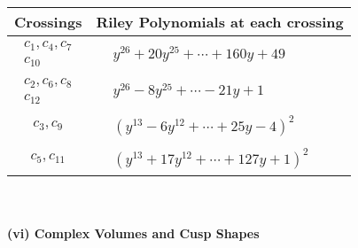 \documentclass[1p]{elsarticle_modified}
\theoremstyle{definition}
\begin{document}
\begin{tabular}{m{50pt}|m{274pt}}
Crossings & \hspace{64pt}Riley Polynomials at each crossing \\
\hline $$\begin{aligned}c_{1},c_{4},c_{7}\\c_{10}\end{aligned}$$&$\begin{aligned}
&y^{26}+20 y^{25}+\cdots+160 y+49
\end{aligned}$\\
\hline $$\begin{aligned}c_{2},c_{6},c_{8}\\c_{12}\end{aligned}$$&$\begin{aligned}
&y^{26}-8 y^{25}+\cdots-21 y+1
\end{aligned}$\\
\hline $$\begin{aligned}c_{3},c_{9}\end{aligned}$$&$\begin{aligned}
&(y^{13}-6 y^{12}+\cdots+25 y-4)^{2}
\end{aligned}$\\
\hline $$\begin{aligned}c_{5},c_{11}\end{aligned}$$&$\begin{aligned}
&(y^{13}+17 y^{12}+\cdots+127 y+1)^{2}
\end{aligned}$\\
\hline
\end{tabular}\\~\\
\newpage\flushleft \textbf{(vi) Complex Volumes and Cusp Shapes}
\end{document}
